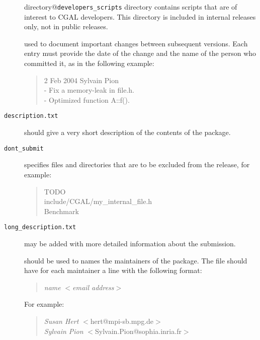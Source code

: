 \begin{description}
{         directory@{\tt developers\_scripts} directory} contains
       scripts that are of interest to CGAL developers. This directory
       is included in internal releases only, not in public releases.
  \item[\ccAnchor{example/changes.txt}{{\tt changes.txt}}]%
     used to document important
    changes between subsequent versions. Each entry must provide the
    date of the change and the name of the person who committed it, as
    in the following example:
       \begin{verse}
       2 Feb 2004  Sylvain Pion\\
       - Fix a memory-leak in file.h.\\
       - Optimized function A::f().
       \end{verse}

  \item[{\tt description.txt}]%
       should give a very short description of the contents of the package. 
  \item[{\tt dont\_submit}]%
     specifies files and directories
    that are to be excluded from the release, for example:
    \begin{verse}
      TODO\\
      include/CGAL/my\_internal\_file.h\\
      Benchmark      
    \end{verse}
  \item[{\tt long\_description.txt}]%
       may be added with more detailed information about the submission. 
  \item[\ccAnchor{example/maintainer}{{\tt maintainer}}]%
       should be used to names the maintainers of the package. The file should
       have for each maintainer a line with the following format:
       \begin{verse}
       {\it name} $<${\it email address}$>$\\
       \end{verse}
       For example:
       \begin{verse}
       {\it Susan Hert} $<$hert@mpi-sb.mpg.de$>$\\
       {\it Sylvain Pion} $<$Sylvain.Pion@sophia.inria.fr$>$\\
       \end{verse}
\end{description}

